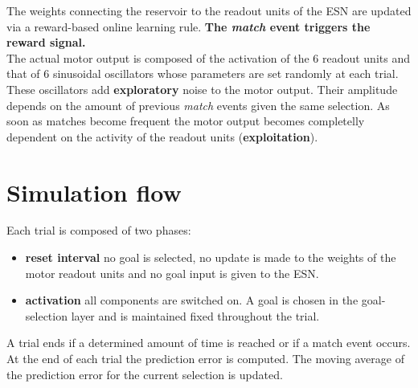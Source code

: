 \documentclass[11pt]{article}
\begin{document}
The weights connecting the reservoir to the readout units of the ESN are
updated via a reward-based online learning rule. \textbf{The \emph{match}
event triggers the reward signal.} \\

The actual motor output is composed of the activation of the 6 readout units
and that of 6 sinusoidal oscillators whose parameters are set randomly at each
trial.  These oscillators add \textbf{exploratory} noise to the motor output.
Their amplitude depends on the amount of previous \emph{match} events given the
same selection.  As soon as matches become frequent the motor output becomes
completelly dependent on the activity of the readout units
(\textbf{exploitation}). 


\section{Simulation flow}

Each trial is composed of two phases:

\begin{itemize}

    \item \textbf{reset interval} no goal is selected, no update is made to the
        weights of the motor readout units and no goal input is given to the
        ESN. 

    \item \textbf{activation} all components are switched on. A goal is chosen
        in the goal-selection layer and is maintained fixed throughout the
        trial.

\end{itemize}

A trial ends if a determined amount of time is reached or if a match event
occurs.  At the end of each trial the prediction error is computed. The moving
average of the prediction error for the current selection is updated.
\end{document}
